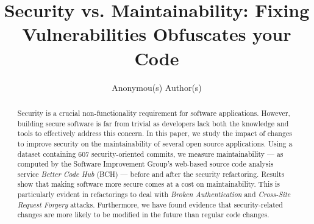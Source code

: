 \documentclass[10pt,conference]{IEEEtran}
\begin{document}
\title{Security vs. Maintainability: Fixing Vulnerabilities Obfuscates your Code%
}

\author{
    Anonymou(s) Author(s)
}

\maketitle

\begin{abstract}
  Security is a crucial non-functionality requirement for software applications.
  However, building secure software is far from trivial as developers lack both
  the knowledge and tools to effectively address this concern. In this paper, we
  study the impact of changes to improve security on the maintainability of several
  open source applications. Using a dataset containing $607$ security-oriented
  commits, we measure maintainability --- as computed by the Software Improvement
  Group's web-based source code analysis service \emph{Better Code Hub} (BCH) ---
  before and after the security refactoring. Results show that making software
  more secure comes at a cost on maintainability. This is particularly evident
  in refactorings to deal with \textit{Broken Authentication} and \textit{Cross-Site Request Forgery} attacks.
  \textcolor{mypink3}{Furthermore, we have found evidence that security-related changes are more
  likely to be modified in the future than regular code changes.}
\end{abstract}
\end{document}
